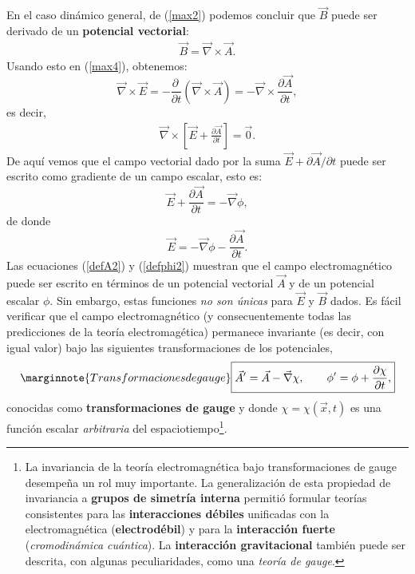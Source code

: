 En el caso dinámico general, de (\ref{max2}) podemos concluir que $\vec{B}$
puede ser derivado de un \textbf{potencial vectorial}:
\begin{eqnarray}\label{defA2}
\boxed{\vec{B}=\vec{\nabla}\times \vec{A}.}
\end{eqnarray}
Usando esto en (\ref{max4}), obtenemos:
\begin{equation}
\vec{\nabla}\times \vec{E} = -  \frac{\partial\ }{\partial
t}(\vec{\nabla}\times\vec{A}) = -\vec{\nabla}\times
\frac{\partial\vec{A}}{\partial t},
\end{equation}
es decir,
\begin{eqnarray}
\vec{\nabla}\times \left[ \vec{E} + \frac{\partial \vec{A}}{\partial t} \right]
= \vec{0}.
\end{eqnarray}
De aquí vemos que el campo vectorial dado por la suma $\vec{E} + {\partial
\vec{A}}/{\partial t}$ puede ser escrito como gradiente de un campo escalar, esto es:
\begin{equation}
\vec{E} + \frac{\partial \vec{A}}{\partial t}= - \vec{\nabla}\phi ,
\end{equation}
de donde
\begin{equation}\label{defphi2}
\boxed{\vec{E} =   - \vec{\nabla}\phi - \frac{\partial \vec{A}}{\partial t}.}
\end{equation}
Las ecuaciones (\ref{defA2}) y (\ref{defphi2}) muestran que el campo
electromagnético puede ser escrito en términos de un potencial vectorial
$\vec{A}$ y de un potencial escalar $\phi$. Sin embargo, estas funciones
\textit{no son únicas} para $\vec{E}$ y $\vec{B}$ dados. Es fácil verificar
que el campo electromagnético (y consecuentemente todas las predicciones de la
teoría electromagética) permanece invariante (es decir, con igual valor) bajo las
siguientes transformaciones de los potenciales,
\begin{equation}\marginnote{Transformaciones de gauge}\label{tgg}
\boxed{{\vec{A}}' = \vec{A} - \vec{\nabla}{\chi}, \qquad \phi' =\phi +
\frac{\partial \chi}{\partial t},}
\end{equation}
conocidas como \textbf{transformaciones de gauge} y donde $\chi=\chi(\vec{x},t)$
es una función escalar \textit{arbitraria} del espaciotiempo\footnote{La invariancia
de la teoría electromagnética bajo transformaciones de gauge
desempeña un rol muy importante. La generalización de esta propiedad de
invariancia a \textbf{grupos de simetría interna} permitió formular
teorías consistentes para las \textbf{interacciones débiles} unificadas con la electromagnética (\textbf{electrodébil}) y para la \textbf{interacción fuerte}
(\textit{cromodinámica cuántica}). La \textbf{interacción gravitacional} también puede ser descrita, con algunas peculiaridades, como una \textit{teoría de gauge}.}.

